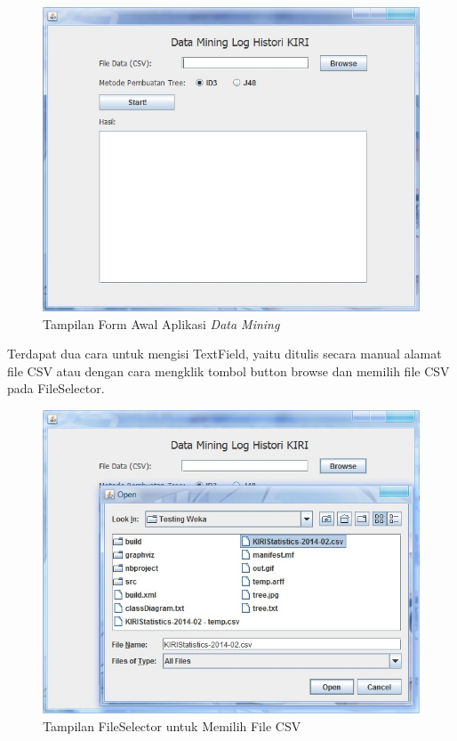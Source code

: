\begin{figure}[H]
\centering
\includegraphics[scale=0.7]{Gambar/GUI1.jpg}
\caption[Tampilan Form Awal Aplikasi \textsl{Data Mining}]{Tampilan Form Awal Aplikasi \textsl{Data Mining}} 
\label{fig:GUI1}
\end{figure}

Terdapat dua cara untuk mengisi TextField, yaitu ditulis secara manual alamat file CSV atau dengan cara mengklik tombol button browse dan memilih file CSV pada FileSelector.

\begin{figure}[H]
\centering
\includegraphics[scale=0.7]{Gambar/GUI2.jpg}
\caption[Tampilan FileSelector untuk Memilih File CSV]{Tampilan FileSelector untuk Memilih File CSV} 
\label{fig:GUI2}
\end{figure}

